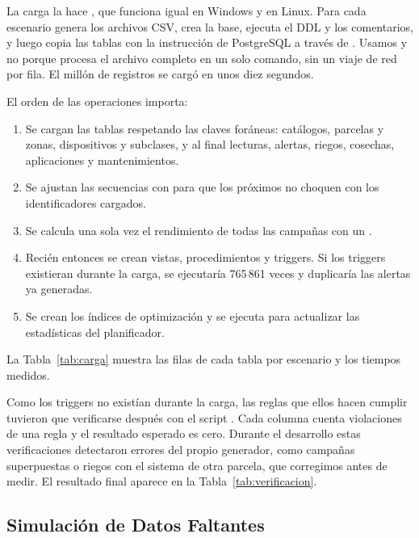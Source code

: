 La carga la hace , que funciona igual en Windows y en Linux. Para cada escenario genera los archivos CSV, crea la base, ejecuta el DDL y los comentarios, y luego copia las tablas con la instrucción  de PostgreSQL a través de . Usamos  y no  porque procesa el archivo completo en un solo comando, sin un viaje de red por fila. El millón de registros se cargó en unos diez segundos.

El orden de las operaciones importa:
\begin{enumerate}[leftmargin=1.6em,itemsep=0.1em]
\item Se cargan las tablas respetando las claves foráneas: catálogos, parcelas y zonas, dispositivos y subclases, y al final lecturas, alertas, riegos, cosechas, aplicaciones y mantenimientos.
\item Se ajustan las secuencias con  para que los próximos  no choquen con los identificadores cargados.
\item Se calcula una sola vez el rendimiento de todas las campañas con un .
\item Recién entonces se crean vistas, procedimientos y triggers. Si los triggers existieran durante la carga,  se ejecutaría 765\,861 veces y duplicaría las alertas ya generadas.
\item Se crean los índices de optimización y se ejecuta  para actualizar las estadísticas del planificador.
\end{enumerate}

La Tabla~\ref{tab:carga} muestra las filas de cada tabla por escenario y los tiempos medidos.


Como los triggers no existían durante la carga, las reglas que ellos hacen cumplir tuvieron que verificarse después con el script . Cada columna cuenta violaciones de una regla y el resultado esperado es cero. Durante el desarrollo estas verificaciones detectaron errores del propio generador, como campañas superpuestas o riegos con el sistema de otra parcela, que corregimos antes de medir. El resultado final aparece en la Tabla~\ref{tab:verificacion}.



\subsection{Simulación de Datos Faltantes}

